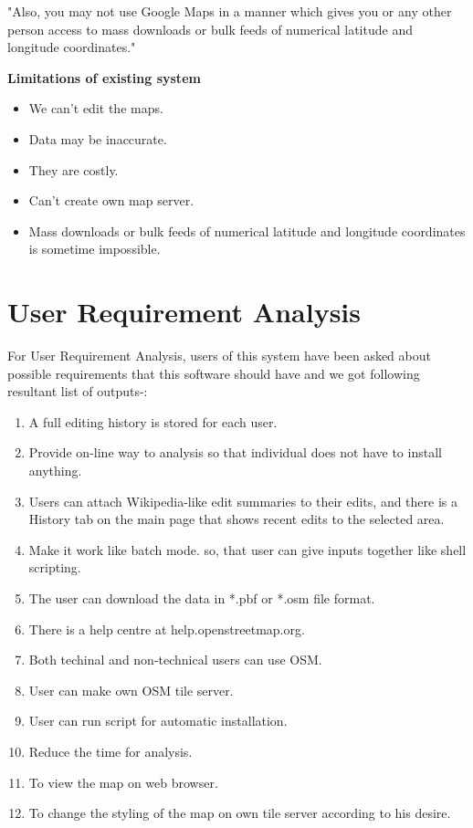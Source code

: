 "Also, you may not use Google Maps in a manner which gives you or any other person access to mass downloads or bulk feeds of numerical latitude and longitude coordinates."

{\bf {Limitations of existing system }}
\begin{itemize}
\item We can't edit the maps.

\item Data may be inaccurate.

\item They are costly.

\item Can't create own map server.

\item Mass downloads or bulk feeds of numerical latitude and longitude coordinates is sometime impossible.
\end{itemize}

\section{User Requirement Analysis}
For User Requirement Analysis, users of this system have been asked about
possible requirements that this software should have and we got following
resultant list of outputs-:
\begin{enumerate}
\item A full editing history is stored for each user.
\item Provide on-line way to analysis so that individual does not have to
install anything.
\item Users can attach Wikipedia-like edit summaries to their edits, and there is a History tab on the main page that shows recent edits to the selected area.
\item Make it work like batch mode. so, that user can give inputs
together like shell scripting.
\item The user can download the data in *.pbf or *.osm file format.
\item There is a help centre at help.openstreetmap.org.
\item Both techinal and non-technical users can use OSM.
\item User can make own OSM tile server.
\item User can run script for automatic installation.
\item Reduce the time for analysis.
\item To view the map on web browser.
\item To change the styling of the map on own tile server according to his desire.

\end{enumerate}



